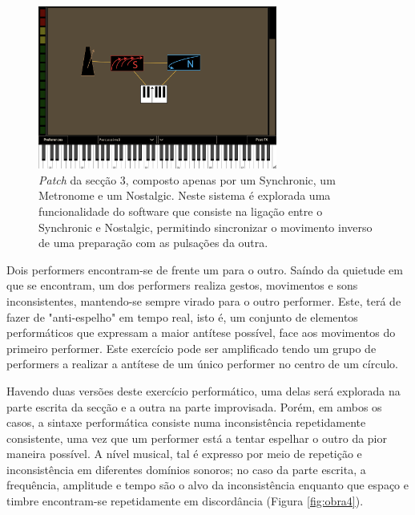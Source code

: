 \documentclass[../main.tex]{subfiles}
\begin{document}
\begin{figure}[h]
    \centering
    \captionsetup{width=0.8\textwidth}
    \includegraphics[width=0.7\textwidth]{images/bit3.png}
    \caption{\textsl{Patch} da secção 3, composto apenas por um Synchronic, um Metronome e um Nostalgic. Neste sistema é explorada uma funcionalidade do software que consiste na ligação entre o Synchronic e Nostalgic, permitindo sincronizar o movimento inverso de uma preparação com as pulsações da outra.}
    \label{fig:bit3}
\end{figure}

\begin{performex}
    Dois performers encontram-se de frente um para o outro. Saíndo da quietude em que se encontram, um dos performers realiza gestos, movimentos e sons inconsistentes, mantendo-se sempre virado para o outro performer. Este, terá de fazer de "anti-espelho" em tempo real, isto é, um conjunto de elementos performáticos que expressam a maior antítese possível, face aos movimentos do primeiro performer. Este exercício pode ser amplificado tendo um grupo de performers a realizar a antítese de um único performer no centro de um círculo.
\end{performex}

Havendo duas versões deste exercício performático, uma delas será explorada na parte escrita da secção e a outra na parte improvisada. Porém, em ambos os casos, a sintaxe performática consiste numa inconsistência repetidamente consistente, uma vez que um performer está a tentar espelhar o outro da pior maneira possível. A nível musical, tal é expresso por meio de repetição e inconsistência em diferentes domínios sonoros; no caso da parte escrita, a frequência, amplitude e tempo são o alvo da inconsistência enquanto que espaço e timbre encontram-se repetidamente em discordância (Figura \ref{fig:obra4}).
\end{document}
